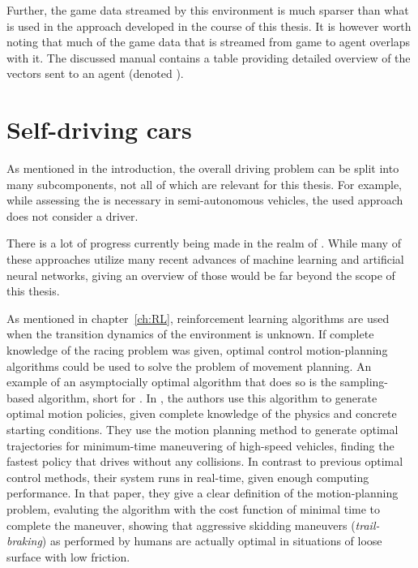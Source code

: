 Further, the game data streamed by this environment is much sparser than what is used in the approach developed in the course of this thesis. It is however worth noting that much of the game data that is streamed from game to agent overlaps with it. The discussed manual \cite{loiacono_simulated_2013} contains a table providing detailed overview of the vectors sent to an agent (denoted ).

\section{Self-driving cars}

As mentioned in the introduction, the overall driving problem can be split into many subcomponents, not all of which are relevant for this thesis. For example, while assessing the  is necessary in semi-autonomous vehicles, the used approach does not consider a driver. 

There is a lot of progress currently being made in the realm of . While many of these approaches utilize many recent advances of machine learning and artificial neural networks, giving an overview of those would be far beyond the scope of this thesis.

As mentioned in chapter~\ref{ch:RL}, reinforcement learning algorithms are used when the transition dynamics of the environment is unknown. If complete knowledge of the racing problem was given, optimal control motion-planning algorithms could be used to solve the problem of movement planning. An example of an asymptocially optimal algorithm that does so is the sampling-based  algorithm, short for . In \cite{hwan_jeon_anytime_2011}, the authors use this algorithm to generate optimal motion policies, given complete knowledge of the physics and concrete starting conditions. They use the motion planning method to generate optimal trajectories for minimum-time maneuvering of high-speed vehicles, finding the fastest policy that drives without any collisions. In contrast to previous optimal control methods, their system runs in real-time, given enough computing performance. In that paper, they give a clear definition of the motion-planning problem, evaluting the algorithm with the cost function of minimal time to complete the maneuver, showing that aggressive skidding maneuvers (\textit{trail-braking}) as performed by humans are actually optimal in situations of loose surface with low friction.

